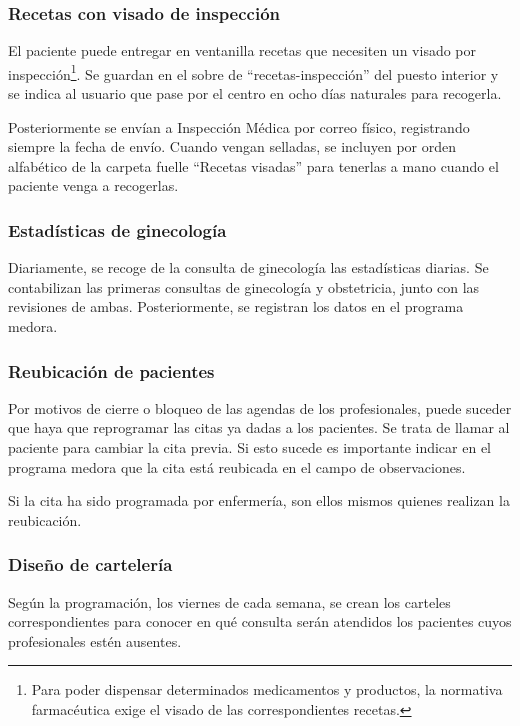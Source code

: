 
\subsubsection{Recetas con visado de inspección}

El paciente puede entregar en ventanilla recetas que necesiten un visado por inspección\footnote{Para poder dispensar determinados medicamentos y productos, la normativa farmacéutica exige el visado de las correspondientes recetas.}.
Se guardan en el sobre de ``recetas-inspección'' del puesto interior y se indica al usuario que pase por el centro en ocho días naturales para recogerla.

Posteriormente se envían a Inspección Médica por correo físico, registrando siempre la fecha de envío.
Cuando vengan selladas, se incluyen por orden alfabético de la carpeta fuelle ``Recetas visadas'' para tenerlas a mano cuando el paciente venga a recogerlas.

\subsubsection{Estadísticas de ginecología}

Diariamente, se recoge de la consulta de ginecología las estadísticas diarias.
Se contabilizan las primeras consultas de ginecología y obstetricia, junto con las revisiones de ambas.
Posteriormente, se registran los datos en el programa \Gls{medora}.

\subsubsection{Reubicación de pacientes}

Por motivos de cierre o bloqueo de las agendas de los profesionales, puede suceder que haya que reprogramar las citas ya dadas a los pacientes.
Se trata de llamar al paciente para cambiar la cita previa. Si esto sucede es importante indicar en el programa \Gls{medora} que la cita está reubicada en el campo de observaciones.

Si la cita ha sido programada por enfermería, son ellos mismos quienes realizan la reubicación.

\subsubsection{Diseño de cartelería}

Según la programación, los viernes de cada semana, se crean los carteles correspondientes para conocer en qué consulta serán atendidos los pacientes cuyos profesionales estén ausentes.

